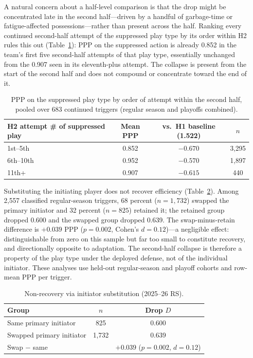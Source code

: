 \documentclass[11pt]{article}
\begin{document}
A natural concern about a half-level comparison is that the drop might be concentrated late in the second half---driven by a handful of garbage-time or fatigue-affected possessions---rather than present across the half. Ranking every continued second-half attempt of the suppressed play type by its order within H2 rules this out (Table~\ref{tab:overtime-table}): PPP on the suppressed action is already 0.852 in the team's first five second-half attempts of that play type, essentially unchanged from the 0.907 seen in its eleventh-plus attempt. The collapse is present from the start of the second half and does not compound or concentrate toward the end of it.

\begin{table}[t]
\centering
\caption{PPP on the suppressed play type by order of attempt within the second half, pooled over 683 continued triggers (regular season and playoffs combined).}
\label{tab:overtime-table}
\begin{tabular}{lccc}
\toprule
H2 attempt \# of suppressed play & Mean PPP & vs.\ H1 baseline (1.522) & $n$ \\
\midrule
1st--5th & 0.852 & $-0.670$ & 3,295 \\
6th--10th & 0.952 & $-0.570$ & 1,897 \\
11th+ & 0.907 & $-0.615$ & 440 \\
\bottomrule
\end{tabular}
\end{table}

Substituting the initiating player does not recover efficiency (Table~\ref{tab:initiator}). Among 2,557 classified regular-season triggers, 68 percent ($n=1{,}732$) swapped the primary initiator and 32 percent ($n=825$) retained it; the retained group dropped 0.600 and the swapped group dropped 0.639. The swap-minus-retain difference is $+0.039$ PPP ($p=0.002$, Cohen's $d=0.12$)---a negligible effect: distinguishable from zero on this sample but far too small to constitute recovery, and directionally opposite to adaptation. The second-half collapse is therefore a property of the play type under the deployed defense, not of the individual initiator. These analyses use held-out regular-season and playoff cohorts and row-mean PPP per trigger.

\begin{table}[t]
\centering
\caption{Non-recovery via initiator substitution (2025--26 RS).}
\label{tab:initiator}
\begin{tabular}{lcc}
\toprule
Group & $n$ & Drop $D$ \\
\midrule
Same primary initiator & 825 & 0.600 \\
Swapped primary initiator & 1,732 & 0.639 \\
Swap $-$ same & & $+0.039$ ($p=0.002$, $d=0.12$) \\
\bottomrule
\end{tabular}
\end{table}
\end{document}
